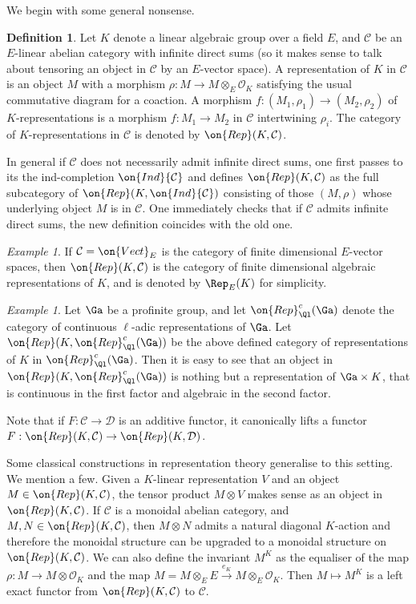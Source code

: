 \documentclass[]{pcmi}
\theoremstyle{plain}
\theoremstyle{remark}
\newtheorem{ex}[equation]{Example}
\theoremstyle{definition}
\newtheorem{dfn}[equation]{Definition}
\newcommand{\mC}{{\mathcal C}}
\newcommand{\mD}{{\mathcal D}}
\newcommand{\mO}{{\mathcal O}}
\begin{document}
We begin with some general nonsense.
\begin{dfn}
Let $K$ denote a linear algebraic group over a field $E$, and $\mC$ be an $E$-linear abelian category with infinite direct sums (so it makes sense to talk about tensoring an object in $\mC$ by an $E$-vector space). 
A representation of $K$ in $\mC$ is an object $M$ with a morphism $\rho: M\to M\otimes_{E}\mO_K$ satisfying the usual commutative diagram for a coaction. A morphism $f: (M_1,\rho_1)\to (M_2,\rho_2)$ of $K$-representations is a morphism $f:M_1\to M_2$ in $\mC$ intertwining $\rho_i$. The category of $K$-representations in $\mC$ is denoted by $\on{Rep}(K,\mC)$.  

In general if $\mC$ does not necessarily admit infinite direct sums, one first passes to its the ind-completion $\on{Ind}\mC$ and defines $\on{Rep}(K,\mC)$ as the full subcategory of $\on{Rep}(K,{\on{Ind}\mC})$ consisting of those $(M,\rho)$ whose underlying object $M$ is in $\mC$. One immediately checks that  if $\mC$ admits infinite direct sums, the new definition coincides with the old one.
\end{dfn}

\begin{ex}If $\mC=\on{Vect}_E$ is the category of finite dimensional $E$-vector spaces, then  $\on{Rep}(K,\mC)$ is the category of finite dimensional algebraic representations of $K$, and is denoted by $\Rep_E(K)$ for simplicity.
\end{ex}
\begin{ex}\label{KLoc}
Let $\Ga$ be a profinite group, and let $\on{Rep}^c_\Ql(\Ga)$ denote the category of continuous $\ell$-adic representations of $\Ga$. Let $\on{Rep}(K,{\on{Rep}^c_\Ql(\Ga)})$ be the above defined category of representations of $K$ in $\on{Rep}^c_\Ql(\Ga)$. Then it is easy to see that an object in $\on{Rep}(K,{\on{Rep}^c_\Ql(\Ga)})$ is nothing but a representation of $\Ga\times K$, that is continuous in the first factor and algebraic in the second factor. 
\end{ex}


Note that if $F:\mC\to \mD$ is an additive functor, it canonically lifts a functor $F:\on{Rep}(K,{\mC})\to \on{Rep}(K,{\mD})$.


Some classical constructions in representation theory generalise to this setting. We mention a few. Given a $K$-linear representation $V$ and an object $M\in \on{Rep}(K,{\mC})$, the tensor product $M\otimes V$ makes sense as an object in $\on{Rep}(K,{\mC})$. If $\mC$ is a monoidal abelian category, and $M,N\in \on{Rep}(K,{\mC})$, then $M\otimes N$ admits a natural diagonal $K$-action and therefore the monoidal structure can be upgraded to a monoidal structure on $\on{Rep}(K,{\mC})$. We can also define the invariant $M^K$ as the equaliser of the map $\rho:M\to M\otimes \mO_K$ and the map $M=M\otimes_EE\stackrel{e_K}{\to} M\otimes_E\mO_K$. Then $M\mapsto M^K$ is a left exact functor from $\on{Rep}(K,{\mC})$ to $\mC$.
\end{document}
